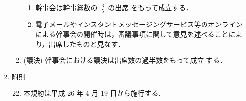\begin{enumerate}
\begin{enumerate}
\begin{enumerate}
    \item 幹事会は幹事総数の~\(\displaystyle{\frac{3}{5}}\)~の出席
をもって成立する．\\
    \item 電子メールやインスタントメッセージングサービス等のオンラインによる幹事会の開催時は，審議事項に関して意見を述べることにより，出席したものと見なす．
\end{enumerate}
%
\item    (議決) 幹事会における議決は出席数の過半数をもって成立
                する．\\
%
%
\end{enumerate}
%
\item	附則\\
%
\begin{enumerate}
\setcounter{enumii}{21}
\item	本規約は平成 26 年 4 月 19 日から施行する. \\
%
%
\end{enumerate}
%
\end{enumerate}
%

